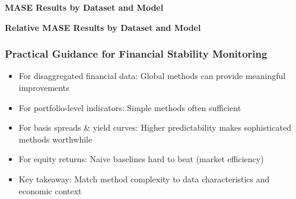 \documentclass[ignorenonframetext, 9pt]{beamer}
\begin{document}
\begin{frame}[plain]
  \tiny
  \vspace{-0.5cm}
  \centering
  \textbf{MASE Results by Dataset and Model}\\
  \vspace{0.2cm}
  
\end{frame}

\begin{frame}[plain]
  \tiny
  \vspace{-0.5cm}
  \centering
  \textbf{Relative MASE Results by Dataset and Model}\\
  \vspace{0.2cm}
  
\end{frame}




\begin{frame}
  \frametitle{Practical Guidance for Financial Stability Monitoring}
  \begin{itemize}
  \item \alert{For disaggregated financial data:} Global methods can provide meaningful improvements
  \vspace{0.3cm}
  \item \alert{For portfolio-level indicators:} Simple methods often sufficient
  \vspace{0.3cm}
  \item \alert{For basis spreads \& yield curves:} Higher predictability makes sophisticated methods worthwhile
  \vspace{0.3cm}
  \item \alert{For equity returns:} Naive baselines hard to beat (market efficiency)
  \vspace{0.3cm}
  \item \alert{Key takeaway:} Match method complexity to data characteristics and economic context
  \end{itemize}
\end{frame}
\end{document}
